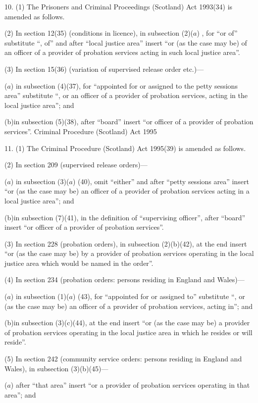 \documentclass[12pt,a4paper]{article}
\begin{document}
10.  (1)  The Prisoners and Criminal Proceedings (Scotland) Act 1993(34) is amended as follows.

(2) In section 12(35) (conditions in licence), in subsection (2)($a$) , for “or of” substitute “, of” and after “local justice area” insert “or (as the case may be) of an officer of a provider of probation services acting in such local justice area”.

(3) In section 15(36) (variation of supervised release order etc.)—

($a$) in subsection (4)(37), for “appointed for or assigned to the petty sessions area” substitute “, or an officer of a provider of probation services, acting in the local justice area”; and

(b)in subsection (5)(38), after “board” insert “or officer of a provider of probation services”.
Criminal Procedure (Scotland) Act 1995

11.  (1)  The Criminal Procedure (Scotland) Act 1995(39) is amended as follows.

(2) In section 209 (supervised release orders)—

($a$) in subsection (3)($a$) (40), omit “either” and after “petty sessions area” insert “or (as the case may be) an officer of a provider of probation services acting in a local justice area”; and

(b)in subsection (7)(41), in the definition of “supervising officer”, after “board” insert “or officer of a provider of probation services”.

(3) In section 228 (probation orders), in subsection (2)(b)(42), at the end insert “or (as the case may be) by a provider of probation services operating in the local justice area which would be named in the order”.

(4) In section 234 (probation orders: persons residing in England and Wales)—

($a$) in subsection (1)($a$) (43), for “appointed for or assigned to” substitute “, or (as the case may be) an officer of a provider of probation services, acting in”; and

(b)in subsection (3)(c)(44), at the end insert “or (as the case may be) a provider of probation services operating in the local justice area in which he resides or will reside”.

(5) In section 242 (community service orders: persons residing in England and Wales), in subsection (3)(b)(45)—

($a$) after “that area” insert “or a provider of probation services operating in that area”; and
\end{document}
